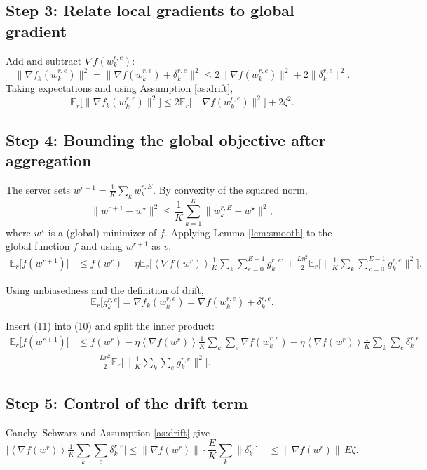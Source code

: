 \documentclass{article}
\newcommand{\EE}{\mathbb{E}}
\newcommand{\inner}[1]{\left\langle#1\right\rangle}
\begin{document}
\subsection*{Step 3: Relate local gradients to global gradient}
Add and subtract $\nabla f(w_{k}^{r,e})$:
\[
\|\nabla f_k(w_{k}^{r,e})\|^{2}
= \|\nabla f(w_{k}^{r,e})+\delta_{k}^{r,e}\|^{2}
\le 2\|\nabla f(w_{k}^{r,e})\|^{2}+2\|\delta_{k}^{r,e}\|^{2}.
\tag{7}
\]
Taking expectations and using Assumption \ref{as:drift},
\[
\EE_{r}\!\bigl[\|\nabla f_k(w_{k}^{r,e})\|^{2}\bigr]
\le 2\EE_{r}\!\bigl[\|\nabla f(w_{k}^{r,e})\|^{2}\bigr]+2\zeta^{2}.
\tag{8}
\]

\subsection*{Step 4: Bounding the global objective after aggregation}
The server sets $w^{r+1}= \frac1K\sum_{k} w_{k}^{r,E}$. By convexity of the squared norm,
\[
\|w^{r+1}-w^{\star}\|^{2}
\le \frac1K\sum_{k=1}^{K}\|w_{k}^{r,E}-w^{\star}\|^{2},
\tag{9}
\]
where $w^{\star}$ is a (global) minimizer of $f$.  
Applying Lemma \ref{lem:smooth} to the global function $f$ and using $w^{r+1}$ as $v$,
\[
\begin{aligned}
\EE_{r}\!\bigl[f(w^{r+1})\bigr]
&\le f(w^{r})-\eta\EE_{r}\!\bigl[\inner{\nabla f(w^{r})}{\tfrac1K\sum_k\sum_{e=0}^{E-1} g_{k}^{r,e}}\bigr]
   +\frac{L\eta^{2}}{2}\EE_{r}\!\bigl[\bigl\|\tfrac1K\sum_k\sum_{e=0}^{E-1} g_{k}^{r,e}\bigr\|^{2}\bigr].
\end{aligned}
\tag{10}
\]

Using unbiasedness and the definition of drift,
\[
\EE_{r}\!\bigl[g_{k}^{r,e}\bigr]=\nabla f_k(w_{k}^{r,e})
=\nabla f(w_{k}^{r,e})+\delta_{k}^{r,e}.
\tag{11}
\]

Insert (11) into (10) and split the inner product:
\[
\begin{aligned}
\EE_{r}\!\bigl[f(w^{r+1})\bigr]
&\le f(w^{r})-\eta\inner{\nabla f(w^{r})}{\tfrac1K\sum_{k}\sum_{e}\nabla f(w_{k}^{r,e})}
     -\eta\inner{\nabla f(w^{r})}{\tfrac1K\sum_{k}\sum_{e}\delta_{k}^{r,e}} \\
&\quad +\frac{L\eta^{2}}{2}\EE_{r}\!\bigl[\bigl\|\tfrac1K\sum_{k}\sum_{e} g_{k}^{r,e}\bigr\|^{2}\bigr].
\end{aligned}
\tag{12}
\]

\subsection*{Step 5: Control of the drift term}
Cauchy–Schwarz and Assumption \ref{as:drift} give
\[
\bigl|\inner{\nabla f(w^{r})}{\tfrac1K\sum_{k}\sum_{e}\delta_{k}^{r,e}}\bigr|
\le \|\nabla f(w^{r})\|\cdot \frac{E}{K}\sum_{k}\|\delta_{k}^{r,\cdot}\|
\le \|\nabla f(w^{r})\|\,E\zeta .
\tag{13}
\]
\end{document}
